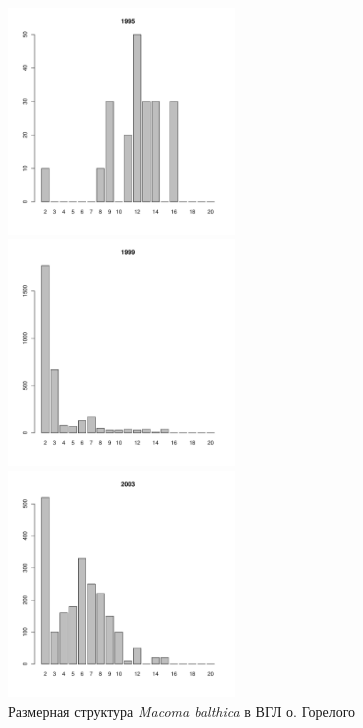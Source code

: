 \begin{figure}[hp]
	\begin{minipage}[b]{.3\linewidth}
	\begin{center}
	\includegraphics[width=60mm]{../White_Sea/Luvenga_Goreliy/high2_1995_.pdf}
	\end{center}
	\end{minipage}
	\hfill
	\begin{minipage}[b]{.3\linewidth}
	\begin{center}
	\includegraphics[width=60mm]{../White_Sea/Luvenga_Goreliy/high2_1999_.pdf}
	\end{center}
	\end{minipage}
	\hfill
	\begin{minipage}[b]{.3\linewidth}
	\begin{center}
	\includegraphics[width=60mm]{../White_Sea/Luvenga_Goreliy/high2_2003_.pdf}
	\end{center}
	\end{minipage}
	\caption{Размерная структура {\it Macoma balthica} в ВГЛ о. Горелого}
	\label{ris:size_str_Goreliy_high}
	\end{figure}

